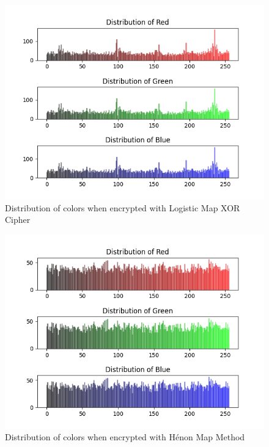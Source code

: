 \documentclass[10pt]{article}
\begin{document}
	\begin{figure}[htbp]
		\centering
		\includegraphics[width=0.95\columnwidth]{LMapStreamDinoEncrypted_histogram.png}
		\caption{Distribution of colors when encrypted with Logistic Map XOR Cipher}
		\label{fig12}
	\end{figure}
	
	
	\begin{figure}[htbp]
		\centering
		\includegraphics[width=0.95\columnwidth]{HenonDinoEncrypted_histogram.png}
		\caption{Distribution of colors when encrypted with Hénon Map Method}
		\label{fig13}
	\end{figure}
	
\end{document}
